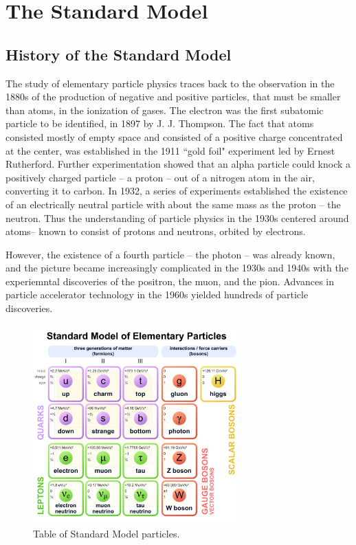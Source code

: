\documentclass{article}
\begin{document}
\section{The Standard Model}

\subsection{History of the Standard Model}

The study of elementary particle physics traces back to the observation in the 1880s of the production of negative and positive particles, that must be smaller than atoms, in the ionization of gases. The electron was the first subatomic particle to be identified, in 1897 by J. J. Thompson. The fact that atoms consisted mostly of empty space and consisted of a positive charge concentrated at the center, was established in the 1911 ``gold foil" experiment led by Ernest Rutherford. Further experimentation showed that an alpha particle could knock a positively charged particle -- a proton -- out of a nitrogen atom in the air, converting it to carbon. In 1932, a series of experiments established the existence of an electrically neutral particle with about the same mass as the proton -- the neutron. Thus the understanding of particle physics in the 1930s centered around atoms-- known to consist of protons and neutrons, orbited by electrons. 

However, the existence of a fourth particle -- the photon -- was already known, and the picture became increasingly complicated in the 1930s and 1940s with the experiemntal discoveries of the positron, the muon, and the pion. Advances in particle accelerator technology in the 1960s yielded hundreds of particle discoveries. 

\begin{figure}[ht]
    \centering
    \includegraphics[width=8cm]{figures/Standard_Model_of_Elementary_Particles.pdf}
    \caption{Table of Standard Model particles.}
    \label{fig:intro-standard-model}
\end{figure}
\end{document}
